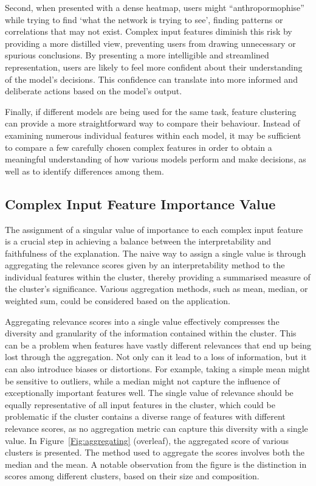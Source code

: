 Second, when presented with a dense heatmap, users might ``anthropormophise'' while trying to find ‘what the network is trying to see’, finding patterns or correlations that may not exist. Complex input features diminish this risk by providing a more distilled view, preventing users from drawing unnecessary or spurious conclusions. By presenting a more intelligible and streamlined representation, users are likely to feel more confident about their understanding of the model's decisions. This confidence can translate into more informed and deliberate actions based on the model's output.

Finally, if different models are being used for the same task, feature clustering can provide a more straightforward way to compare their behaviour. Instead of examining numerous individual features within each model, it may be sufficient to compare a few carefully chosen complex features in order to obtain a meaningful understanding of how various models perform and make decisions, as well as to identify differences among them.

\subsection{Complex Input Feature Importance Value}

The assignment of a singular value of importance to each complex input feature is a crucial step in achieving a balance between the interpretability and faithfulness of the explanation. The naive way to assign a single value is through aggregating the relevance scores given by an interpretability method to the individual features within the cluster, thereby providing a summarised measure of the cluster's significance. Various aggregation methods, such as mean, median, or weighted sum, could be considered based on the application. 

Aggregating relevance scores into a single value effectively compresses the diversity and granularity of the information contained within the cluster. This can be a problem when features have vastly different relevances that end up being lost through the aggregation. Not only can it lead to a loss of information, but it can also introduce biases or distortions. For example, taking a simple mean might be sensitive to outliers, while a median might not capture the influence of exceptionally important features well. The single value of relevance should be equally representative of all input features in the cluster, which could be problematic if the cluster contains a diverse range of features with different relevance scores, as no aggregation metric can capture this diversity with a single value. In Figure~\ref{Fig:aggregating} (overleaf), the aggregated score of various clusters is presented. The method used to aggregate the scores involves both the median and the mean. A notable observation from the figure is the distinction in scores among different clusters, based on their size and composition.


